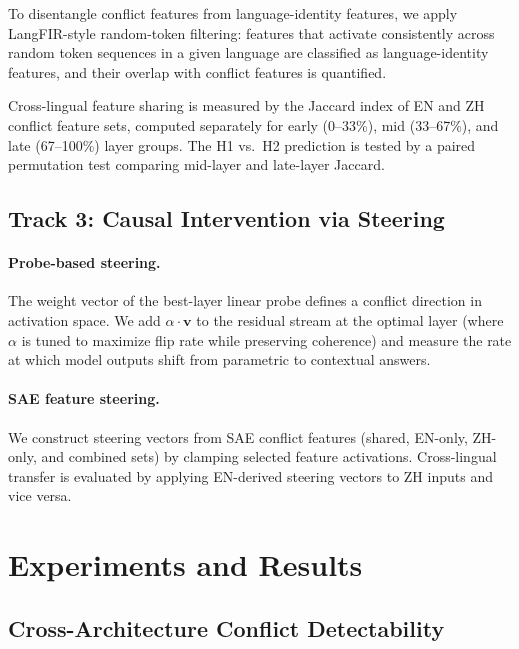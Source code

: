 \documentclass{article}
\begin{document}
To disentangle conflict features from language-identity features, we apply LangFIR-style random-token filtering: features that activate consistently across random token sequences in a given language are classified as language-identity features, and their overlap with conflict features is quantified.

Cross-lingual feature sharing is measured by the Jaccard index of EN and ZH conflict feature sets, computed separately for early (0--33\%), mid (33--67\%), and late (67--100\%) layer groups. The H1 vs.\ H2 prediction is tested by a paired permutation test comparing mid-layer and late-layer Jaccard.

\subsection{Track 3: Causal Intervention via Steering}

\paragraph{Probe-based steering.}
The weight vector of the best-layer linear probe defines a conflict direction in activation space. We add $\alpha \cdot \mathbf{v}$ to the residual stream at the optimal layer (where $\alpha$ is tuned to maximize flip rate while preserving coherence) and measure the rate at which model outputs shift from parametric to contextual answers.

\paragraph{SAE feature steering.}
We construct steering vectors from SAE conflict features (shared, EN-only, ZH-only, and combined sets) by clamping selected feature activations. Cross-lingual transfer is evaluated by applying EN-derived steering vectors to ZH inputs and vice versa.

\section{Experiments and Results}

\subsection{Cross-Architecture Conflict Detectability}
\label{sec:detectability}
\end{document}
